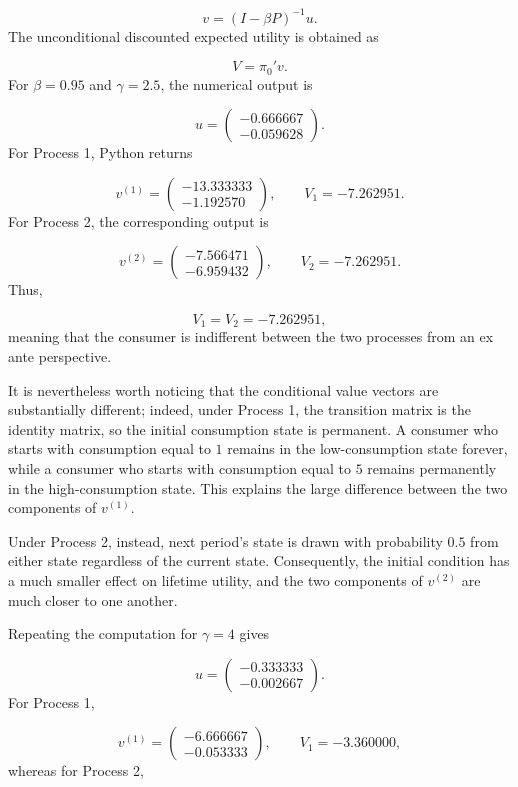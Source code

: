 \documentclass[11pt]{article}
\begin{document}
\[
v=(I-\beta P)^{-1}u.
\]
The unconditional discounted expected utility is obtained as

\[
V=\pi_0'v.
\]
For $\beta=0.95$ and $\gamma=2.5$, the numerical output is

\[
u=
\begin{pmatrix}
-0.666667\\
-0.059628
\end{pmatrix}.
\]
For Process 1, Python returns

\[
v^{(1)}=
\begin{pmatrix}
-13.333333\\
-1.192570
\end{pmatrix},
\qquad
V_1=-7.262951.
\]
For Process 2, the corresponding output is

\[
v^{(2)}=
\begin{pmatrix}
-7.566471\\
-6.959432
\end{pmatrix},
\qquad
V_2=-7.262951.
\]
Thus,

\[
\boxed{V_1=V_2=-7.262951},
\]
meaning that the consumer is indifferent between the two processes from an ex ante perspective.

It is nevertheless worth noticing that the conditional value vectors are
substantially different; indeed, under Process 1, the transition matrix is the identity
matrix, so the initial consumption state is permanent. A consumer who starts
with consumption equal to $1$ remains in the low-consumption state forever,
while a consumer who starts with consumption equal to $5$ remains permanently
in the high-consumption state. This explains the large difference between the
two components of $v^{(1)}$.

Under Process 2, instead, next period's state is drawn with probability $0.5$
from either state regardless of the current state. Consequently, the initial
condition has a much smaller effect on lifetime utility, and the two components
of $v^{(2)}$ are much closer to one another.

Repeating the computation for $\gamma=4$ gives

\[
u=
\begin{pmatrix}
-0.333333\\
-0.002667
\end{pmatrix}.
\]
For Process 1,

\[
v^{(1)}=
\begin{pmatrix}
-6.666667\\
-0.053333
\end{pmatrix},
\qquad
V_1=-3.360000,
\]
whereas for Process 2,
\end{document}
